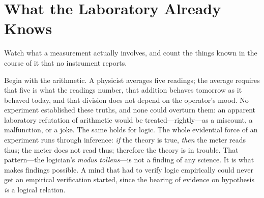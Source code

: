 \section{What the Laboratory Already Knows}

Watch what a measurement actually involves, and count the things known in the course of it that no instrument reports.

Begin with the arithmetic. A physicist averages five readings; the average requires that five is what the readings number, that addition behaves tomorrow as it behaved today, and that division does not depend on the operator's mood. No experiment established these truths, and none could overturn them: an apparent laboratory refutation of arithmetic would be treated---rightly---as a miscount, a malfunction, or a joke. The same holds for logic. The whole evidential force of an experiment runs through inference: \emph{if} the theory is true, \emph{then} the meter reads thus; the meter does not read thus; therefore the theory is in trouble. That pattern---the logician's \emph{modus tollens}---is not a finding of any science. It is what makes findings possible. A mind that had to verify logic empirically could never get an empirical verification started, since the bearing of evidence on hypothesis \emph{is} a logical relation.

